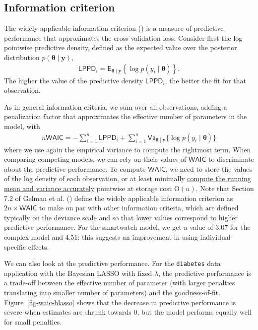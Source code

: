 \documentclass[
  11pt,
  letterpaper,
]{scrbook}
\theoremstyle{definition}
\theoremstyle{plain}
\theoremstyle{plain}
\theoremstyle{definition}
\theoremstyle{definition}
\theoremstyle{remark}
\begin{document}
\subsection{Information criterion}\label{information-criterion}

The widely applicable information criterion
() is a measure of predictive
performance that approximates the cross-validation loss. Consider first
the log pointwise predictive density, defined as the expected value over
the posterior distribution
\(p(\boldsymbol{\theta} \mid \boldsymbol{y})\), \begin{align*}
\mathsf{LPPD}_i = \mathsf{E}_{\boldsymbol{\theta} \mid \boldsymbol{y}} \left\{ \log p(y_i \mid \boldsymbol{\theta})\right\}.
\end{align*} The higher the value of the predictive density
\(\mathsf{LPPD}_i\), the better the fit for that observation.

As in general information criteria, we sum over all observations, adding
a penalization factor that approximates the effective number of
parameters in the model, with \begin{align*}
n\mathsf{WAIC} = -\sum_{i=1}^n \mathsf{LPPD}_i + \sum_{i=1}^n \mathsf{Va}_{\boldsymbol{\theta} \mid \boldsymbol{y}}\{\log p(y_i \mid \boldsymbol{\theta})\}
\end{align*} where we use again the empirical variance to compute the
rightmost term. When comparing competing models, we can rely on their
values of \(\mathsf{WAIC}\) to discriminate about the predictive
performance. To compute \(\mathsf{WAIC}\), we need to store the values
of the log density of each observation, or at least minimally
\href{https://www.johndcook.com/blog/standard_deviation/}{compute the
running mean and variance accurately} pointwise at storage cost
\(\mathrm{O}(n)\). Note that Section 7.2 of Gelman et al.
() define the widely applicable
information criterion as \(2n \times \mathsf{WAIC}\) to make on par with
other information criteria, which are defined typically on the deviance
scale and so that lower values correspond to higher predictive
performance. For the smartwatch model, we get a value of 3.07 for the
complex model and 4.51: this suggests an improvement in using
individual-specific effects.

We can also look at the predictive performance. For the
\texttt{diabetes} data application with the Bayesian LASSO with fixed
\(\lambda\), the predictive performance is a trade-off between the
effective number of parameter (with larger penalties translating into
smaller number of parameters) and the goodness-of-fit.
Figure~\ref{fig-waic-blasso} shows that the decrease in predictive
performance is severe when estimates are shrunk towards 0, but the model
performs equally well for small penalties.
\end{document}
